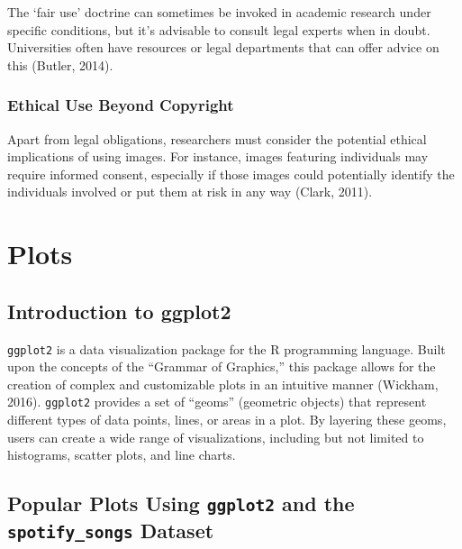 \documentclass[
  b5paper]{book}
\begin{document}
The `fair use' doctrine can sometimes be invoked in academic research under specific conditions, but it's advisable to consult legal experts when in doubt. Universities often have resources or legal departments that can offer advice on this (Butler, 2014).

\hypertarget{ethical-use-beyond-copyright}{%
\subsubsection{Ethical Use Beyond Copyright}\label{ethical-use-beyond-copyright}}

Apart from legal obligations, researchers must consider the potential ethical implications of using images. For instance, images featuring individuals may require informed consent, especially if those images could potentially identify the individuals involved or put them at risk in any way (Clark, 2011).

\hypertarget{plots-1}{%
\section{Plots}\label{plots-1}}

\hypertarget{introduction-to-ggplot2}{%
\subsection{Introduction to ggplot2}\label{introduction-to-ggplot2}}

\texttt{ggplot2} is a data visualization package for the R programming language. Built upon the concepts of the ``Grammar of Graphics,'' this package allows for the creation of complex and customizable plots in an intuitive manner (Wickham, 2016). \texttt{ggplot2} provides a set of ``geoms'' (geometric objects) that represent different types of data points, lines, or areas in a plot. By layering these geoms, users can create a wide range of visualizations, including but not limited to histograms, scatter plots, and line charts.

\hypertarget{popular-plots-using-ggplot2-and-the-spotify_songs-dataset}{%
\subsection{\texorpdfstring{Popular Plots Using \texttt{ggplot2} and the \texttt{spotify\_songs} Dataset}{Popular Plots Using ggplot2 and the spotify\_songs Dataset}}\label{popular-plots-using-ggplot2-and-the-spotify_songs-dataset}}
\end{document}
